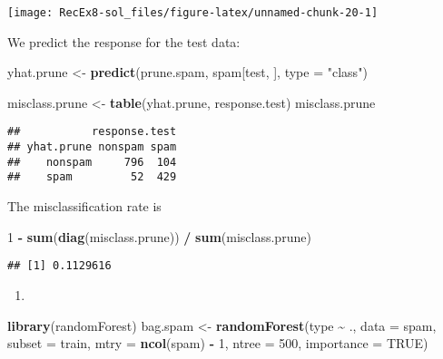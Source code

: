 \documentclass[
]{article}
\newenvironment{Shaded}{\begin{snugshade}}{\end{snugshade}}
\newcommand{\AttributeTok}[1]{\textcolor[rgb]{0.13,0.29,0.53}{#1}}
\newcommand{\ConstantTok}[1]{\textcolor[rgb]{0.56,0.35,0.01}{#1}}
\newcommand{\DecValTok}[1]{\textcolor[rgb]{0.00,0.00,0.81}{#1}}
\newcommand{\FunctionTok}[1]{\textcolor[rgb]{0.13,0.29,0.53}{\textbf{#1}}}
\newcommand{\NormalTok}[1]{#1}
\newcommand{\OtherTok}[1]{\textcolor[rgb]{0.56,0.35,0.01}{#1}}
\newcommand{\SpecialCharTok}[1]{\textcolor[rgb]{0.81,0.36,0.00}{\textbf{#1}}}
\newcommand{\StringTok}[1]{\textcolor[rgb]{0.31,0.60,0.02}{#1}}
\providecommand{\tightlist}{%
  \setlength{\itemsep}{0pt}\setlength{\parskip}{0pt}}
\begin{document}
\texttt{[image: RecEx8-sol\_files/figure-latex/unnamed-chunk-20-1]}

We predict the response for the test data:

\begin{Shaded}
\begin{Highlighting}[]
\NormalTok{yhat.prune }\OtherTok{\textless{}{-}} \FunctionTok{predict}\NormalTok{(prune.spam, spam[test, ], }\AttributeTok{type =} \StringTok{"class"}\NormalTok{)}

\NormalTok{misclass.prune }\OtherTok{\textless{}{-}} \FunctionTok{table}\NormalTok{(yhat.prune, response.test)}
\NormalTok{misclass.prune}
\end{Highlighting}
\end{Shaded}

\begin{verbatim}
##           response.test
## yhat.prune nonspam spam
##    nonspam     796  104
##    spam         52  429
\end{verbatim}

The misclassification rate is

\begin{Shaded}
\begin{Highlighting}[]
\DecValTok{1} \SpecialCharTok{{-}} \FunctionTok{sum}\NormalTok{(}\FunctionTok{diag}\NormalTok{(misclass.prune)) }\SpecialCharTok{/} \FunctionTok{sum}\NormalTok{(misclass.prune)}
\end{Highlighting}
\end{Shaded}

\begin{verbatim}
## [1] 0.1129616
\end{verbatim}

\begin{enumerate}
\def\labelenumi{\alph{enumi})}
\setcounter{enumi}{5}
\tightlist
\item
\end{enumerate}

\begin{Shaded}
\begin{Highlighting}[]
\FunctionTok{library}\NormalTok{(randomForest)}
\NormalTok{bag.spam }\OtherTok{\textless{}{-}} \FunctionTok{randomForest}\NormalTok{(type }\SpecialCharTok{\textasciitilde{}}\NormalTok{ .,}
                         \AttributeTok{data =}\NormalTok{ spam,}
                         \AttributeTok{subset =}\NormalTok{ train,}
                         \AttributeTok{mtry =} \FunctionTok{ncol}\NormalTok{(spam) }\SpecialCharTok{{-}} \DecValTok{1}\NormalTok{,}
                         \AttributeTok{ntree =} \DecValTok{500}\NormalTok{,}
                         \AttributeTok{importance =} \ConstantTok{TRUE}\NormalTok{)}
\end{Highlighting}
\end{Shaded}
\end{document}

